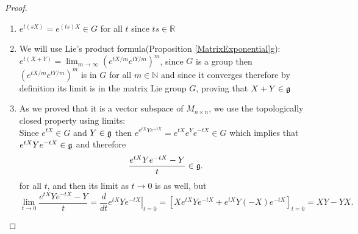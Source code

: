 \begin{proof}
\begin{enumerate}[label=(\alph*)]
	\item $e^{t(sX)}=e^{(ts)X} \in G$ for all $t$ since $ts \in \mathbb{R}$
	\item We will use Lie's product formula(Proposition \ref{MatrixExponential}g):
	$e^{t(X+Y)} = \lim_{m \rightarrow \infty}(e^{tX/m}e^{tY/m})^m$, since $G$ is a group then $(e^{tX/m}e^{tY/m})^m$ is in $G$ for all $m \in \mathbb{N}$ and since it converges therefore by definition its limit is in the matrix Lie group $G$, proving that $X+Y \in \mathfrak{g}$
	\item As we proved that it is a vector subspace of $M_{n\times n}$, we use the topologically closed property using limits:\\
	Since $e^{tX} \in G$ and $Y \in \mathfrak{g}$ then $e^{e^{tX}Ye^{-tX}} = e^{tX}e^{Y}e^{-tX} \in G$ which implies that $e^{tX}Ye^{-tX} \in\mathfrak{g}$ and therefore $$\frac{e^{tX}Ye^{-tX}-Y}{t} \in \mathfrak{g}.$$ for all $t$, and then its limit as $t\rightarrow 0$ is as well, but 
	$$\lim_{t\rightarrow 0}\frac{e^{tX}Ye^{-tX}-Y}{t} = \frac{d}{dt} \left.e^{tX}Ye^{-tX}\right|_{t=0} = [Xe^{tX}Ye^{-tX} + e^{tX}Y(-X)e^{-tX}]_{t=0} = XY-YX.$$
\end{enumerate}
\end{proof}